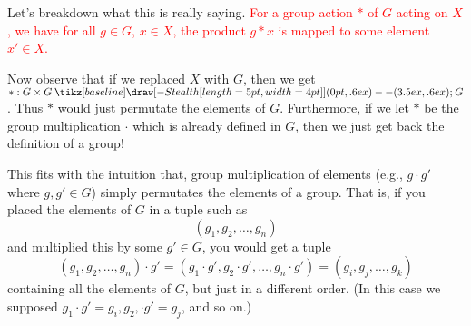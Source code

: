 \documentclass[12pt,letterpaper]{algebra_book}
\renewcommand{\to}{\mathbin{\tikz[baseline] \draw[-{Stealth[length=5pt,width=4pt]}] (0pt,.6ex) -- (3.5ex,.6ex);}}
\theoremstyle{definition}
\begin{document}
    Let's breakdown what this is really saying.
    \textcolor{red}{For a group
    action $*$ of $G$ acting on $X$, we have for all $g \in G$, $x \in
    X$, the product $g * x$ is mapped to some element $x' \in X$.}

    Now observe that if
    we replaced $X$ with $G$, then we get $* : G \times G \to G$.
    Thus $*$ would just permutate the elements of $G$.
    Furthermore, if we let $*$ be the group multiplication $\cdot$ which
    is already defined in $G$, then we just get back the definition of
    a group! 
    
    \textcolor{NavyBlue}{This fits with the intuition that,
    group multiplication of elements (e.g., $g \cdot g'$ where $g, g'
    \in G$) simply permutates the elements of a group. That is, if 
    you placed the elements of $G$ in a tuple such as 
    \[
        (g_1, g_2, \dots, g_n)
    \] 
    and multiplied this by some $g' \in G$, you would get a tuple 
    \[
        (g_1, g_2, \dots, g_n) \cdot g' 
        = (g_1\cdot g', g_2 \cdot g' , \dots, g_n\cdot g')
        =
        (g_i, g_j, \dots, g_k)
    \]
    containing all the elements of $G$, but just in a different order.
    (In this case we supposed $g_1 \cdot g' = g_i, g_2, \cdot g' =
    g_j$, and so on.)
    } 
\end{document}
